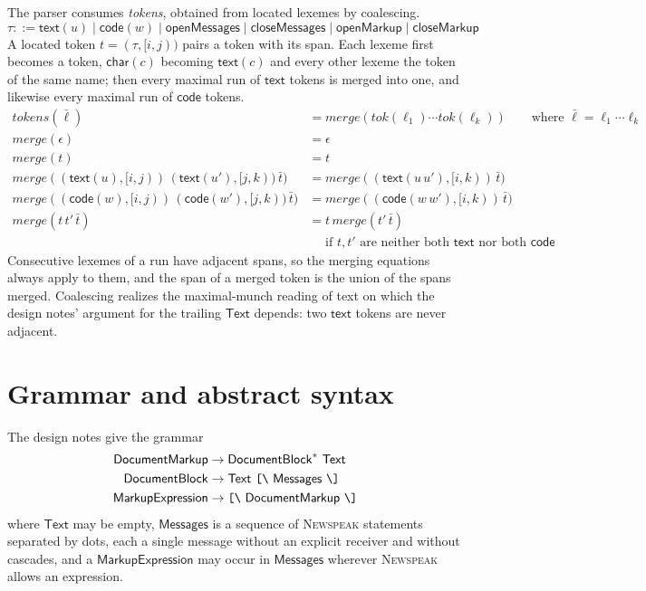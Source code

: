 \documentclass[11pt]{article}
\numberwithin{equation}{section}
\newcommand{\NS}{\textsc{Newspeak}}
\newcommand{\kw}[1]{\ensuremath{\mathsf{#1}}}
\newcommand{\str}[1]{\ensuremath{\text{\texttt{#1}}}}
\newcommand{\bs}{\textbackslash}
\newcommand{\Open}{\str{[\bs}}
\newcommand{\Close}{\str{\bs]}}
\begin{document}
The parser consumes \emph{tokens}, obtained from located lexemes by
coalescing.
\begin{equation}\label{eq:tokens}
\tau ::= \kw{text}(u) \mid \kw{code}(w) \mid \kw{openMessages}
  \mid \kw{closeMessages} \mid \kw{openMarkup} \mid \kw{closeMarkup}
\end{equation}
A located token $t = (\tau, [i,j))$ pairs a token with its span.  Each
lexeme first becomes a token, $\kw{char}(c)$ becoming $\kw{text}(c)$ and
every other lexeme the token of the same name; then every maximal run of
$\kw{text}$ tokens is merged into one, and likewise every maximal run of
$\kw{code}$ tokens.
\begin{equation}\label{eq:coalesce}
\begin{aligned}
\mathit{tokens}(\bar\ell) &= \mathit{merge}(\mathit{tok}(\ell_1) \cdots
  \mathit{tok}(\ell_k)) \qquad \text{where } \bar\ell = \ell_1 \cdots \ell_k \\
\mathit{merge}(\epsilon) &= \epsilon \\
\mathit{merge}(t) &= t \\
\mathit{merge}((\kw{text}(u), [i,j))\,(\kw{text}(u'), [j,k))\,\bar t)
  &= \mathit{merge}((\kw{text}(u\,u'), [i,k))\,\bar t) \\
\mathit{merge}((\kw{code}(w), [i,j))\,(\kw{code}(w'), [j,k))\,\bar t)
  &= \mathit{merge}((\kw{code}(w\,w'), [i,k))\,\bar t) \\
\mathit{merge}(t\,t'\,\bar t) &= t\,\mathit{merge}(t'\,\bar t)
\\
  &\phantom{{}={}} \text{if } t, t' \text{ are neither both } \kw{text}
     \text{ nor both } \kw{code}
\end{aligned}
\end{equation}
Consecutive lexemes of a run have adjacent spans, so the merging equations
always apply to them, and the span of a merged token is the union of the
spans merged.  Coalescing realizes the maximal-munch reading of text on
which the design notes' argument for the trailing $\kw{Text}$ depends: two
$\kw{text}$ tokens are never adjacent.

\section{Grammar and abstract syntax}
\label{sec:grammar}

The design notes give the grammar
\begin{equation}\label{eq:concrete-grammar}
\begin{aligned}
\kw{DocumentMarkup} &\to \kw{DocumentBlock}^{*}\ \kw{Text} \\
\kw{DocumentBlock} &\to \kw{Text}\ \Open\ \kw{Messages}\ \Close \\
\kw{MarkupExpression} &\to \Open\ \kw{DocumentMarkup}\ \Close
\end{aligned}
\end{equation}
where $\kw{Text}$ may be empty, $\kw{Messages}$ is a sequence of \NS{}
statements separated by dots, each a single message without an explicit
receiver and without cascades, and a $\kw{MarkupExpression}$ may occur in
$\kw{Messages}$ wherever \NS{} allows an expression.
\end{document}
